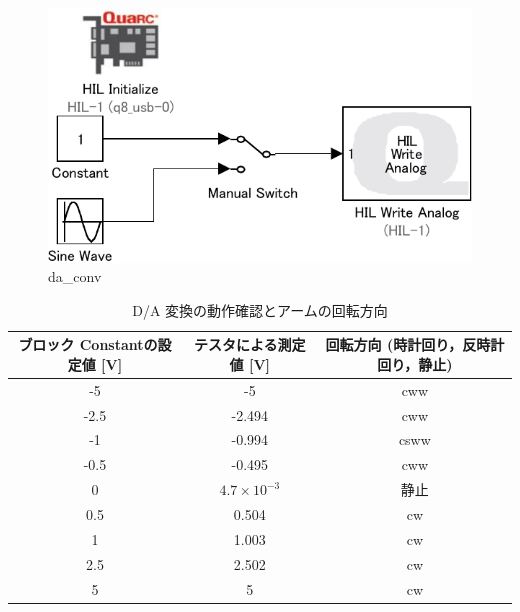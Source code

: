 \begin{figure}[h]
  \centering
  \includegraphics[scale=1]{sozai/da_conv-crop.pdf}
  \caption{da\_conv}
\end{figure}

\newpage

\begin{table}[h]
  \centering
  \caption{D/A 変換の動作確認とアームの回転方向}
  \begin{tabular}{|c|c|c|}
    \hline
    ブロック Constantの設定値 [V] & テスタによる測定値 [V] & 回転方向 (時計回り，反時計回り，静止) \\ \hline
    -5                            & -5                     & cww                                   \\ \hline
    -2.5                          & -2.494                 & cww                                   \\ \hline
    -1                            & -0.994                 & csww                                  \\ \hline
    -0.5                          & -0.495                 & cww                                   \\ \hline
    0                             & \(4.7×10^{-3}\)        & 静止                                  \\ \hline
    0.5                           & 0.504                  & cw                                    \\ \hline
    1                             & 1.003                  & cw                                    \\ \hline
    2.5                           & 2.502                  & cw                                    \\ \hline
    5                             & 5                      & cw                                    \\ \hline
  \end{tabular}
\end{table}

